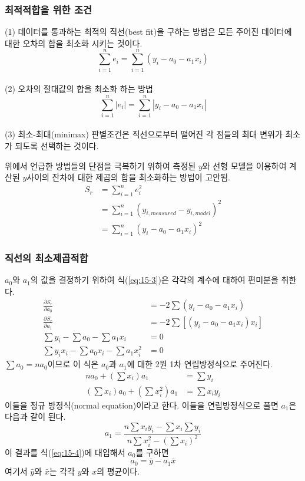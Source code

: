 \subsubsection{최적적합을 위한 조건}
(1) 데이터를 통과하는 최적의 직선(best fit)을 구하는 방법은 모든 주어진 데이터에 대한 오차의 합을 최소화 시키는 것이다.
\begin{equation}\label{eq:15-2a}
\sum_{i=1}^{n}e_{i}=\sum_{i=1}^{n}(y_{i}-a_{0}-a_{1}x_{i})
\end{equation}
\\
(2) 오차의 절대값의 합을 최소화 하는 방법
\begin{equation}\label{eq:15-2b}
\sum_{i=1}^{n}\left|e_{i}\right|=\sum_{i=1}^{n}\left|y_{i}-a_{0}-a_{1}x_{i}\right|
\end{equation}
\\
(3) 최소-최대(minimax) 판별조건은 직선으로부터 떨어진 각 점들의 최대 변위가 최소가 되도록 선택하는 것이다.

위에서 언급한 방법들의 단점을 극복하기 위하여 측정된 $y$와 선형 모델을 이용하여 계산된 $y$사이의 잔차에 대한 제곱의 합을 최소화하는 방법이 고안됨.
\begin{align}
S_{r}&=\sum_{i=1}^{n}e_{i}^2\nonumber\\
&=\sum_{i=1}^{n}\left(y_{i,measured}-y_{i,model}\right)^2\nonumber\\
&=\sum_{i=1}^{n}\left(y_{i}-a_{0}-a_{1}x_{i}\right)^2\label{eq:15-3}
\end{align}
\subsubsection{직선의 최소제곱적합}
$a_{0}$와 $a_{1}$의 값을 결정하기 위하여 식(\ref{eq:15-3})은 각각의 계수에 대하여 편미분을 취한다.
\begin{align*}
\frac{\partial S_{r}}{\partial a_{0}}&=-2\sum\left(y_{i}-a_{0}-a_{1}x_{i}\right)\\
\frac{\partial S_{r}}{\partial a_{1}}&=-2\sum\left[\left(y_{i}-a_{0}-a_{1}x_{i}\right)x_{i}\right]\\
\sum y_{i}-\sum a_{0}-\sum a_{1}x_{i}&=0\\
\sum y_{i}x_{i}-\sum a_{0}x_{i}-\sum a_{1}x_{i}^{2}&=0
\end{align*}
$\sum a_{0}=na_{0}$이므로 이 식은 $a_{0}$과 $a_{1}$에 대한 2원 1차 연립방정식으로 주어진다.
\begin{align}
na_{0}+\left(\sum x_{i}\right)a_{1}&=\sum y_{i}\label{eq:15-4}\\
\left(\sum x_{i}\right)a_{0}+\left(\sum x_{i}^{2} \right)a_{1}&=\sum x_{i}y_{i}
\end{align}
이들을 정규 방정식(normal equation)이라고 한다. 이들을 연립방정식으로 풀면 $a_{1}$은 다음과 같이 된다.
\begin{equation}
a_{1}=\frac{n\sum x_{i}y_{i}-\sum x_{i}\sum y_{i}}{n\sum x_{i}^{2}-\left(\sum x_{i}\right)^{2}}
\end{equation}
이 결과를 식(\ref{eq:15-4})에 대입해서 $a_{0}$를 구하면
\begin{equation}
a_{0}=\bar{y}-a_{1}\bar{x}
\end{equation}
여기서 $\bar{y}$와 $\bar{x}$는 각각 $y$와 $x$의 평균이다.
